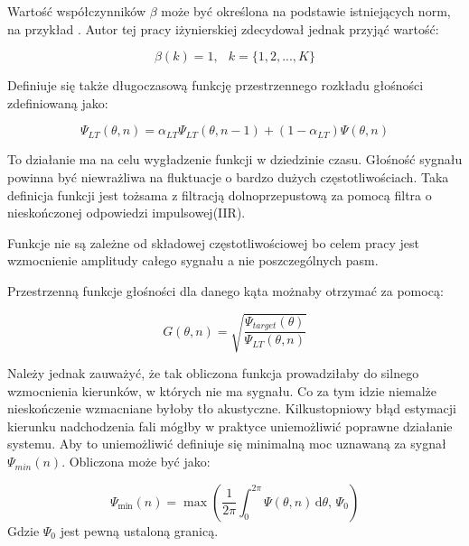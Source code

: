 \noindent Wartość współczynników $\beta$ może być określona na podstawie istniejących norm, na przykład \cite{coef}. Autor tej pracy iżynierskiej zdecydował jednak przyjąć wartość:

\begin{equation}
    \label{equation:beta}
    \beta(k) = 1, \,\,\,\ k=\{1,2,...,K\}
\end{equation}

\noindent Definiuje się także długoczasową funkcję przestrzennego rozkładu głośności zdefiniowaną jako:

\begin{equation}
    \label{equation:LT_SLD}
    \Psi_{LT}(\theta,n)=
    \alpha_{LT}\Psi_{LT}(\theta,n-1)
    +(1-\alpha_{LT})\Psi(\theta,n)
\end{equation}

\noindent To działanie ma na celu wygładzenie funkcji w dziedzinie czasu. Głośność sygnału powinna być niewrażliwa na fluktuacje o bardzo dużych częstotliwościach. Taka definicja funkcji jest tożsama z filtracją dolnoprzepustową za pomocą filtra o nieskończonej odpowiedzi impulsowej(IIR).

\noindent Funkcje nie są zależne od składowej częstotliwościowej bo celem pracy jest wzmocnienie amplitudy całego sygnału a nie poszczególnych pasm.

\noindent Przestrzenną funkcje głośności dla danego kąta możnaby otrzymać za pomocą:

\begin{equation}
    \label{equation:sqrt}
    G(\theta,n)=
    \sqrt{\dfrac{\Psi_{target}(\theta)}{
    \Psi_{LT}(\theta,n)}}
\end{equation}

\noindent Należy jednak zauważyć, że tak obliczona funkcja prowadziłaby do silnego wzmocnienia kierunków, w których nie ma sygnału. Co za tym idzie niemalże nieskończenie wzmacniane byłoby tło akustyczne. Kilkustopniowy błąd estymacji kierunku nadchodzenia fali mógłby w praktyce uniemożliwić poprawne działanie systemu. Aby to uniemożliwić definiuje się minimalną moc uznawaną za sygnał $\Psi_{min}(n)$. Obliczona może być jako:

\begin{equation}
    \Psi_{\min}(n)=
    \max({\dfrac{1}{2\pi} \int_{0}^{2\pi} \Psi(\theta,n) \, \mathrm{d}\theta, \, \Psi_{0}})
\end{equation}
Gdzie $\Psi_{0}$ jest pewną ustaloną granicą.

\newpage

